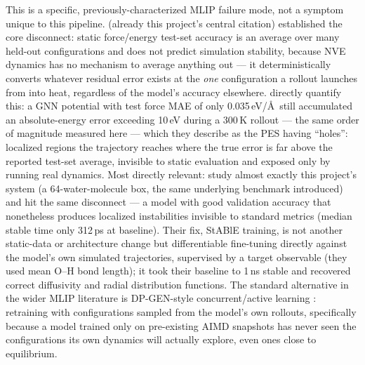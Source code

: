\documentclass[11pt]{article}
\begin{document}
This is a specific, previously-characterized MLIP failure mode, not a
symptom unique to this pipeline. \citet{fu2022forces} (already this
project's central citation) established the core disconnect: static
force/energy test-set accuracy is an average over many held-out
configurations and does not predict simulation stability, because NVE
dynamics has no mechanism to average anything out --- it deterministically
converts whatever residual error exists at the \emph{one} configuration
a rollout launches from into heat, regardless of the model's accuracy
elsewhere. \citet{stocker2022robust} directly quantify this: a GNN
potential with test force MAE of only 0.035\,eV/\AA\ still accumulated an
absolute-energy error exceeding 10\,eV during a 300\,K rollout --- the same
order of magnitude measured here --- which they describe as the PES having
``holes'': localized regions the trajectory reaches where the true error is
far above the reported test-set average, invisible to static evaluation
and exposed only by running real dynamics. Most directly relevant:
\citet{raja2025stable} study almost exactly this project's system (a
64-water-molecule box, the same underlying benchmark \citet{fu2022forces}
introduced) and hit the same disconnect --- a model with good validation
accuracy that nonetheless produces localized instabilities invisible to
standard metrics (median stable time only 312\,ps at baseline). Their fix,
StABlE training, is not another static-data or architecture change but
differentiable fine-tuning directly against the model's own simulated
trajectories, supervised by a target observable (they used mean O--H bond
length); it took their baseline to 1\,ns stable and recovered correct
diffusivity and radial distribution functions. The standard alternative in
the wider MLIP literature is DP-GEN-style concurrent/active learning
\citep{zhang2020dpgen}: retraining with configurations sampled from the
model's own rollouts, specifically because a model trained only on
pre-existing AIMD snapshots has never seen the configurations its own
dynamics will actually explore, even ones close to equilibrium.
\end{document}
